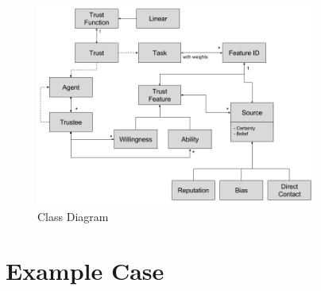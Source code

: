 \begin{figure}[hbt]
	\centering
	\includegraphics[height=250px]{figures/Class_Diagram.png}
	\caption{Class Diagram}
	\label{fig:classDiagram}
\end{figure}

\section{Example Case}



